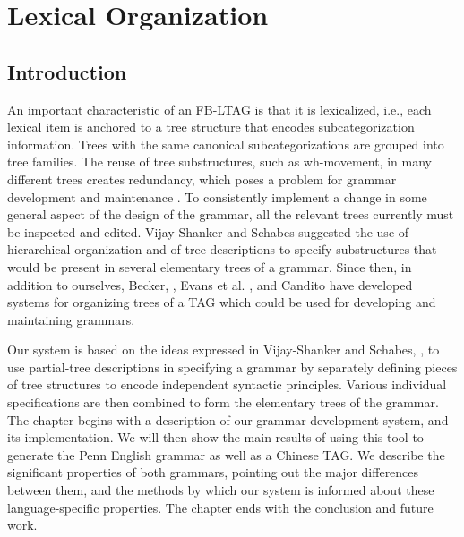  
 
\chapter{Lexical Organization} 
\label{lexorg} 
 
 
% 
 
 
% 
 
% 
 
 
\section{Introduction} 
 
 
An important characteristic of an 
FB-LTAG is that it is lexicalized, i.e., each lexical item is anchored to a 
tree structure that encodes subcategorization information.  Trees with the same 
canonical subcategorizations are grouped into tree families.  The reuse of tree 
substructures, such as wh-movement, 
 in many different trees 
creates redundancy, which poses a problem for grammar development 
and maintenance \cite{vijay-schabes92}.  To consistently implement a change in 
some general aspect of the design of the grammar, all the relevant trees 
currently must be inspected and edited.  Vijay Shanker and Schabes suggested 
the use of hierarchical organization and of tree descriptions to specify 
substructures that would be present in several elementary trees of a grammar. 
Since then, in addition to ourselves, 
Becker, \cite{becker94}, Evans et al. \cite{Evans95}, and 
Candito\cite{Candito96} have 
developed systems for organizing trees of a TAG which could be used for 
developing and maintaining grammars. 
 
 Our system is based 
on the ideas expressed in Vijay-Shanker and Schabes, \cite{vijay-schabes92}, to 
use partial-tree descriptions in specifying a grammar by separately defining 
pieces of tree structures to encode independent syntactic principles. Various 
individual specifications are then combined to form the elementary trees of the 
grammar. The chapter begins with a description of 
our grammar development system, and its implementation. We will then 
show the main results of using this tool to generate 
the Penn English grammar as well as a Chinese 
TAG.  We describe the significant properties of both grammars, pointing out the 
major differences between them, and the methods by which our system is informed 
about these language-specific properties.  The chapter ends with the conclusion 
and future work. 
 
